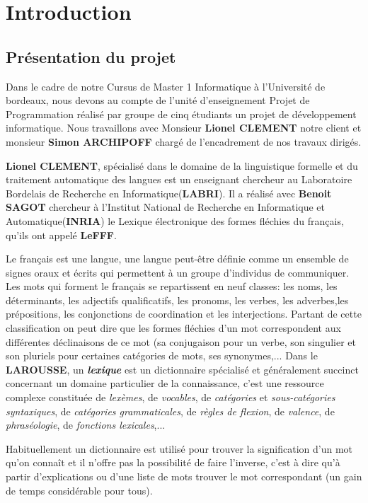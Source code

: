 \clearpage
\setcounter{page}{1}
\pagestyle{plain}
\newpage
\section{Introduction}
\subsection{Présentation du projet}
Dans le cadre de notre Cursus de Master 1 Informatique à l'Université de bordeaux, nous devons au compte de l'unité d'enseignement Projet de Programmation réalisé par groupe de cinq étudiants un projet de développement informatique. Nous travaillons avec Monsieur \textbf{Lionel CLEMENT} notre client et monsieur \textbf{Simon ARCHIPOFF} chargé de l'encadrement de nos travaux dirigés.


{\textbf{Lionel CLEMENT}, spécialisé dans le domaine de la linguistique formelle et du traitement automatique des langues est un enseignant chercheur au Laboratoire Bordelais de Recherche en Informatique(\textbf{LABRI}). Il a réalisé avec \textbf{Benoit SAGOT} \cite{lefff_int} chercheur à l'Institut National de Recherche en Informatique et Automatique(\textbf{INRIA})  le Lexique électronique des formes fléchies du français, qu'ils ont appelé \textbf{LeFFF}\cite{tagset}\cite{lefff}.\par}
{Le français est une langue, une langue peut-être définie comme un ensemble de signes oraux et écrits qui permettent à un groupe d'individus de communiquer. Les mots qui forment le français se repartissent en neuf classes: les noms, les déterminants, les adjectifs qualificatifs, les pronoms, les verbes, les adverbes,les prépositions, les conjonctions de coordination et les interjections. Partant de cette classification on peut dire que les formes fléchies d'un mot correspondent aux différentes déclinaisons de ce mot (sa conjugaison pour un verbe, son singulier et son pluriels pour certaines catégories de mots, ses synonymes,...
Dans le \textbf{LAROUSSE}, un \textit{\bf lexique} est un dictionnaire spécialisé et généralement succinct concernant un domaine particulier de la connaissance, c'est une ressource complexe constituée de \textit{lexèmes}, de \textit{vocables}, de \textit{catégories} et \textit{sous-catégories syntaxiques}, de \textit{catégories grammaticales}, de \textit{règles de flexion}, de \textit{valence}, de \textit{phraséologie}, de \textit{fonctions lexicales},...\par}

{Habituellement un dictionnaire est utilisé pour trouver la signification d'un mot qu'on connaît et il n'offre pas la possibilité de faire l'inverse, c'est à dire qu'à partir d'explications ou d'une liste de mots trouver le mot correspondant (un gain de temps considérable pour tous).\par}

